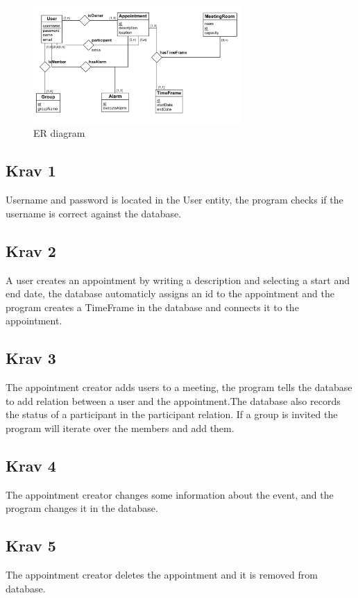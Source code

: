 \documentclass[a4paper, 10pt]{article}
\begin{document}


\begin{figure}[h!] 
    \begin{center}  
        \includegraphics[width=8cm]{erdiagram.png}
        \caption{ER diagram}
    \label{class}
    \end{center}
\end{figure}

\subsection*{Krav 1}
Username and password is located in the User entity, the program checks if the username is correct against the database.

\subsection*{Krav 2}
A user creates an appointment by writing a description and selecting a start and end date, the database automaticly assigns an id to the appointment and the program creates a TimeFrame in the database and connects it to the appointment.

\subsection*{Krav 3}
The appointment creator adds users to a meeting, the program tells the database to add relation between a user and the appointment.The database also records the status of a participant in the participant relation. If a group is invited the program will iterate over the members and add them.

\subsection*{Krav 4}
The appointment creator changes some information about the event, and the program changes it in the database.

\subsection*{Krav 5}
The appointment creator deletes the appointment and it is removed from database.
\end{document}
